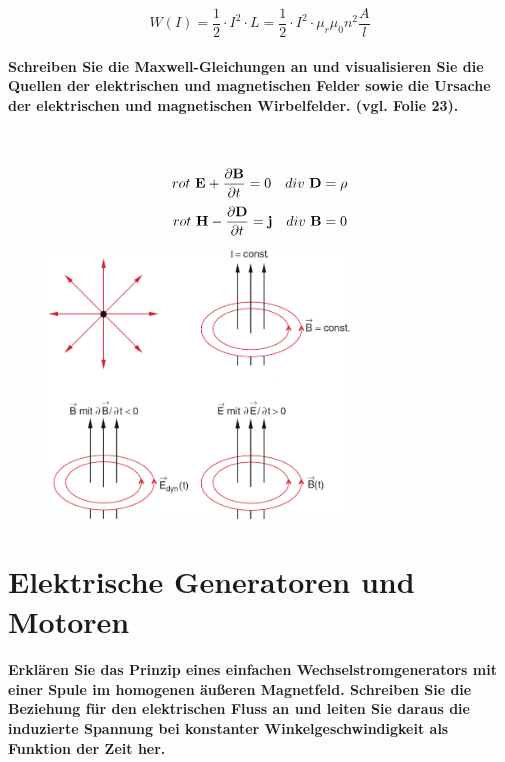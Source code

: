 \documentclass[a4paper, 11pt, ngerman, parskip=half-]{scrartcl}
\begin{document}
\begin{equation}
    W(I) = \frac{1}{2} \cdot I^2 \cdot L = \frac{1}{2} \cdot I^2 \cdot \mu_r \mu_0 n^2 \frac{A}{l}
\end{equation}

\paragraph{Schreiben Sie die Maxwell-Gleichungen an und visualisieren Sie die Quellen der
    elektrischen und magnetischen Felder sowie die Ursache der elektrischen und magnetischen
    Wirbelfelder. (vgl. Folie 23).} ~

\begin{equation}
    rot~\bold{E} + \pdv{\bold{B}}{t} = 0 ~~~ div~\bold{D} = \rho
\end{equation}
\begin{equation}
    rot~\bold{H} - \pdv{\bold{D}}{t} = \bold{j} ~~~ div~\bold{B} = 0
\end{equation}

\begin{figure}[H]
    \centering
    \includegraphics[width=8cm]{image/07/13}
\end{figure}

\newpage

\section{Elektrische Generatoren und Motoren}

\paragraph{Erklären Sie das Prinzip eines einfachen Wechselstromgenerators mit einer Spule im
    homogenen äußeren Magnetfeld. Schreiben Sie die Beziehung für den elektrischen Fluss an und leiten
    Sie daraus die induzierte Spannung bei konstanter Winkelgeschwindigkeit als Funktion der Zeit
    her.} ~
\end{document}
